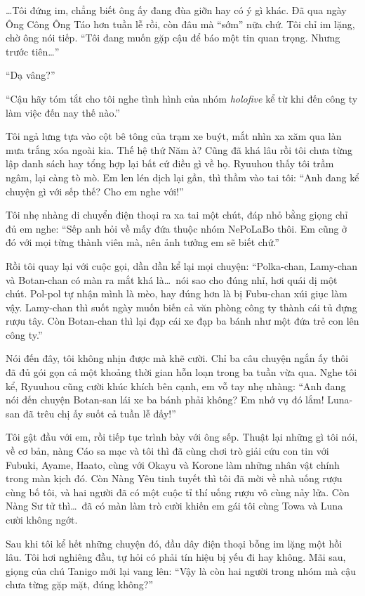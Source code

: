 \documentclass[../main.tex]{subfiles}
\begin{document}
\dots Tôi đứng im, chẳng biết ông ấy đang đùa giỡn hay có ý gì khác. Đã qua ngày Ông Công Ông Táo hơn tuần lễ rồi, còn đâu mà ``sớm'' nữa chứ. Tôi chỉ im lặng, chờ ông nói tiếp. ``Tôi đang muốn gặp cậu để báo một tin quan trọng. Nhưng trước tiên\dots''

``Dạ vâng?''

``Cậu hãy tóm tắt cho tôi nghe tình hình của nhóm \textit{holofive} kể từ khi đến công ty làm việc đến nay thế nào.''

Tôi ngả lưng tựa vào cột bê tông của trạm xe buýt, mắt nhìn xa xăm qua làn mưa trắng xóa ngoài kia. Thế hệ thứ Năm à? Cũng đã khá lâu rồi tôi chưa từng lập danh sách hay tổng hợp lại bất cứ điều gì về họ. Ryuuhou thấy tôi trầm ngâm, lại càng tò mò. Em len lén dịch lại gần, thì thầm vào tai tôi: ``Anh đang kể chuyện gì với sếp thế? Cho em nghe với!''

Tôi nhẹ nhàng di chuyển điện thoại ra xa tai một chút, đáp nhỏ bằng giọng chỉ đủ em nghe: ``Sếp anh hỏi về mấy đứa thuộc nhóm NePoLaBo thôi. Em cũng ở đó với mọi từng thành viên mà, nên ảnh tưởng em sẽ biết chứ.''

Rồi tôi quay lại với cuộc gọi, dần dần kể lại mọi chuyện: ``Polka-chan, Lamy-chan và Botan-chan có màn ra mắt khá là\dots\ nói sao cho đúng nhỉ, hơi quái dị một chút. Pol-pol tự nhận mình là mèo, hay đúng hơn là bị Fubu-chan xúi giục làm vậy. Lamy-chan thì suốt ngày muốn biến cả văn phòng công ty thành cái tủ đựng rượu tây. Còn Botan-chan thì lại đạp cái xe đạp ba bánh như một đứa trẻ con lên công ty.''

Nói đến đây, tôi không nhịn được mà khẽ cười. Chỉ ba câu chuyện ngắn ấy thôi đã đủ gói gọn cả một khoảng thời gian hỗn loạn trong ba tuần vừa qua. Nghe tôi kể, Ryuuhou cũng cười khúc khích bên cạnh, em vỗ tay nhẹ nhàng: ``Anh đang nói đến chuyện Botan-san lái xe ba bánh phải không? Em nhớ vụ đó lắm! Luna-san đã trêu chị ấy suốt cả tuần lễ đấy!''

Tôi gật đầu với em, rồi tiếp tục trình bày với ông sếp. Thuật lại những gì tôi nói, về cơ bản, nàng Cáo sa mạc và tôi thì đã cùng chơi trò giải cứu con tin với Fubuki, Ayame, Haato, cùng với Okayu và Korone làm những nhân vật chính trong màn kịch đó. Còn Nàng Yêu tinh tuyết thì tôi đã mời về nhà uống rượu cùng bố tôi, và hai người đã có một cuộc tỉ thí uống rượu vô cùng nảy lửa. Còn Nàng Sư tử thì\dots\ đã có màn làm trò cười khiến em gái tôi cùng Towa và Luna cười không ngớt.

Sau khi tôi kể hết những chuyện đó, đầu dây điện thoại bỗng im lặng một hồi lâu. Tôi hơi nghiêng đầu, tự hỏi có phải tín hiệu bị yếu đi hay không. Mãi sau, giọng của chú Tanigo mới lại vang lên: ``Vậy là còn hai người trong nhóm mà cậu chưa từng gặp mặt, đúng không?''
\end{document}
